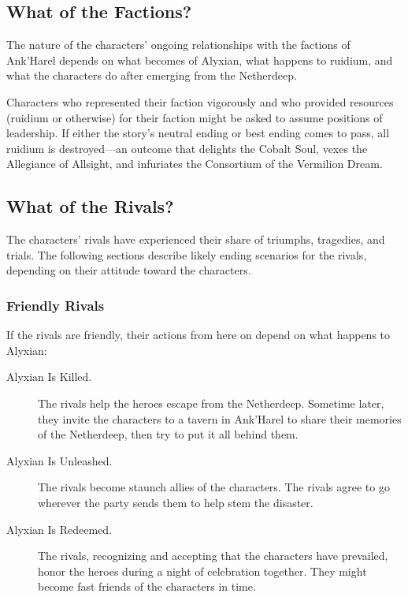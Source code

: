 \documentclass[letterpaper, 11pt, bg=full, twocolumn]{dndbook}
\begin{document}
\subsection{What of the Factions?}

The nature of the characters' ongoing relationships with the factions of Ank'Harel depends on what becomes of Alyxian, what happens to ruidium, and what the characters do after emerging from the Netherdeep.

Characters who represented their faction vigorously and who provided resources (ruidium or otherwise) for their faction might be asked to assume positions of leadership. If either the story's neutral ending or best ending comes to pass, all ruidium is destroyed---an outcome that delights the Cobalt Soul, vexes the Allegiance of Allsight, and infuriates the Consortium of the Vermilion Dream.


\subsection{What of the Rivals?}

The characters' rivals have experienced their share of triumphs, tragedies, and trials. The following sections describe likely ending scenarios for the rivals, depending on their attitude toward the characters.

\subsubsection{Friendly Rivals}

If the rivals are friendly, their actions from here on depend on what happens to Alyxian:

\begin{description}
\item[Alyxian Is Killed.] The rivals help the heroes escape from the Netherdeep. Sometime later, they invite the characters to a tavern in Ank'Harel to share their memories of the Netherdeep, then try to put it all behind them.
\item[Alyxian Is Unleashed.] The rivals become staunch allies of the characters. The rivals agree to go wherever the party sends them to help stem the disaster.
\item[Alyxian Is Redeemed.] The rivals, recognizing and accepting that the characters have prevailed, honor the heroes during a night of celebration together. They might become fast friends of the characters in time.
\end{description}
\end{document}
